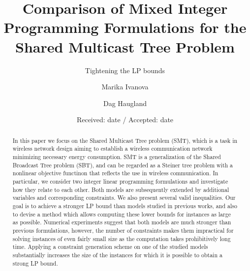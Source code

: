 \title{Comparison of Mixed Integer Programming Formulations for the Shared Multicast Tree Problem%
}
\subtitle{Tightening the LP bounds}


\author{Marika Ivanova        \and
         Dag Haugland%
}



\date{Received: date / Accepted: date}


\maketitle

\begin{abstract}
In this paper we focus on the Shared Multicast Tree problem (SMT), which is 
a task in wireless network design aiming to establish a wireless 
communication network minimizing necessary energy consumption. SMT is a 
generalization of the Shared Broadcast Tree problem (SBT), and can be 
regarded as a Steiner tree problem with a nonlinear objective functinon that
reflects the use in wireless communication. In particular, we consider two 
integer linear programming formulations and investigate how they relate to 
each other.  Both models are subsequently extended by additional variables and corresponding constraints. We also present several valid inequalities. Our goal is to achieve a stronger LP bound than models studied in previous works, and also to devise 
a method which allows computing these lower bounds for instances as 
large as possible. Numerical experiments suggest that both models are much 
stronger than previous formulations, however, the number of constraints 
makes them impractical for solving instances of even fairly small size as 
the computation takes prohibitively long time. Applying a constraint 
generation scheme on one of the studied models substantially increases the 
size of the instances for which it is possible to obtain a strong LP 
bound. 
\end{abstract}

